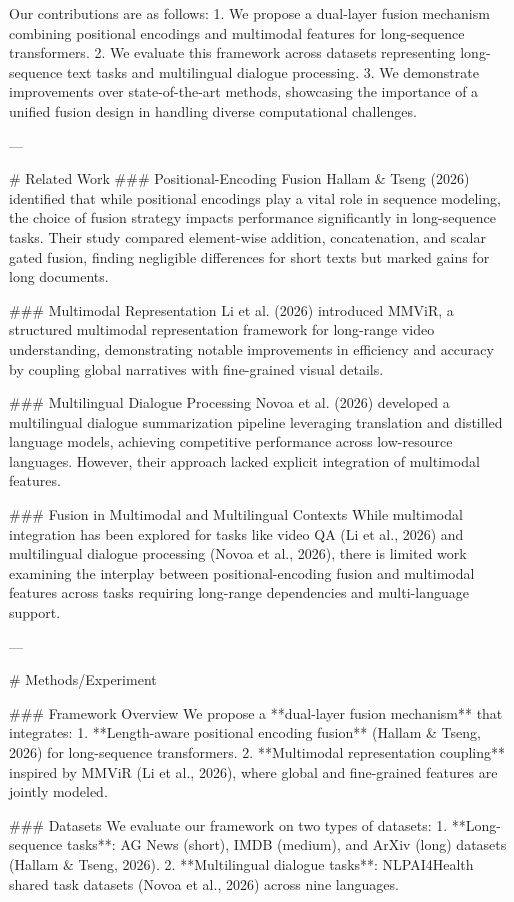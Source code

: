 Our contributions are as follows:
1. We propose a dual-layer fusion mechanism combining positional encodings and multimodal features for long-sequence transformers.
2. We evaluate this framework across datasets representing long-sequence text tasks and multilingual dialogue processing.
3. We demonstrate improvements over state-of-the-art methods, showcasing the importance of a unified fusion design in handling diverse computational challenges.

---

# Related Work  
### Positional-Encoding Fusion  
Hallam & Tseng (2026) identified that while positional encodings play a vital role in sequence modeling, the choice of fusion strategy impacts performance significantly in long-sequence tasks. Their study compared element-wise addition, concatenation, and scalar gated fusion, finding negligible differences for short texts but marked gains for long documents.

### Multimodal Representation  
Li et al. (2026) introduced MMViR, a structured multimodal representation framework for long-range video understanding, demonstrating notable improvements in efficiency and accuracy by coupling global narratives with fine-grained visual details.

### Multilingual Dialogue Processing  
Novoa et al. (2026) developed a multilingual dialogue summarization pipeline leveraging translation and distilled language models, achieving competitive performance across low-resource languages. However, their approach lacked explicit integration of multimodal features.

### Fusion in Multimodal and Multilingual Contexts  
While multimodal integration has been explored for tasks like video QA (Li et al., 2026) and multilingual dialogue processing (Novoa et al., 2026), there is limited work examining the interplay between positional-encoding fusion and multimodal features across tasks requiring long-range dependencies and multi-language support.

---

# Methods/Experiment  

### Framework Overview  
We propose a **dual-layer fusion mechanism** that integrates:
1. **Length-aware positional encoding fusion** (Hallam & Tseng, 2026) for long-sequence transformers.
2. **Multimodal representation coupling** inspired by MMViR (Li et al., 2026), where global and fine-grained features are jointly modeled.

### Datasets  
We evaluate our framework on two types of datasets:
1. **Long-sequence tasks**: AG News (short), IMDB (medium), and ArXiv (long) datasets (Hallam & Tseng, 2026).
2. **Multilingual dialogue tasks**: NLPAI4Health shared task datasets (Novoa et al., 2026) across nine languages.

